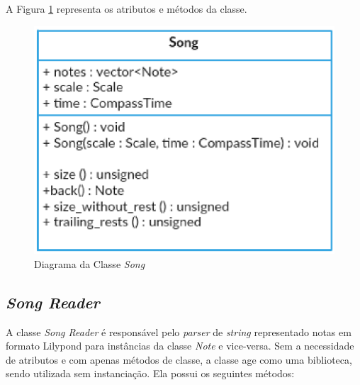       A Figura \ref{songclass} representa os atributos e métodos da classe.

      \begin{figure}[htb]
        \centering
        \includegraphics[scale=0.7]{figuras/songclass.eps}
        \caption{Diagrama da Classe \textit{Song}}
        \label{songclass}
      \end{figure}

    \subsection[\textit{Song Reader}]{\textit{Song Reader}}


      A classe \textit{Song Reader} é responsável pelo \textit{parser} de \textit{string} representado notas em formato Lilypond para instâncias da classe \textit{Note} e vice-versa. Sem a necessidade de atributos e com apenas métodos de classe, a classe age como uma biblioteca, sendo utilizada sem instanciação. Ela possui os seguintes métodos:


